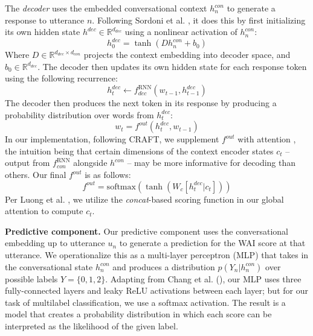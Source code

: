 \documentclass{article}
\begin{document}
The \textit{decoder} uses the embedded conversational context $h^{con}_n$ to generate a response to utterance $n$. Following Sordoni et al. \citeyear{sordoni2015hierarchical}, it does this by first initializing its own hidden state $h^{dec} \in \mathbb{R}^{d_{dec}}$ using a nonlinear activation of $h^{con}_n$:
\begin{equation}
  h^{dec}_0 = \tanh(D h^{con}_n + b_0)
\end{equation}
Where $D \in \mathbb{R}^{d_{dec} \times d_{con}}$ projects the context embedding into decoder space, and $b_0 \in \mathbb{R}^{d_{dec}}$. 
The decoder then updates its own hidden state for each response token using the following recurrence:
\begin{equation}
  h^{dec}_{t} \gets f^{\mathrm{RNN}}_{dec}(w_{t-1}, h^{dec}_{t-1})
\end{equation}
The decoder then produces the next token in its response by producing a probability distribution over words from $h^{dec}_t$:
\begin{equation}
  w_t = f^{out}(h^{dec}_t, w_{t-1})
\end{equation}
In our implementation, following CRAFT, we supplement $f^{out}$ with attention \cite{luong2015effective}, the intuition being that certain dimensions of the context encoder states $c_t$ -- output from $f^{\mathrm{RNN}}_{con}$ alongside $h^{con}$ -- may be more informative for decoding than others. Our final $f^{out}$ is as follows:
\begin{equation}
  f^{out} = \mbox{softmax}(\tanh(W_c [h^{dec}_t|c_t]))
\end{equation}
Per Luong et al. \citeyear{luong2015effective}, we utilize the \textit{concat}-based scoring function in our global attention to compute $c_t$.

\textbf{Predictive component.} Our predictive component uses the conversational embedding up to utterance $u_n$ to generate a prediction for the WAI score at that utterance. We operationalize this as a multi-layer perceptron (MLP) that takes in the conversational state $h^{con}_n$ and produces a distribution $p(Y_n|h^{con}_n)$ over possible labels $Y=\{0,1,2\}$. Adapting from Chang et al. (\citeyear{Chang-Trouble:19}), our MLP uses three fully-connected layers and leaky ReLU activations between each layer; but for our task of multilabel classification, we use a softmax activation. The result is a model that creates a probability distribution in which each score can be interpreted as the likelihood of the given label.
\end{document}
